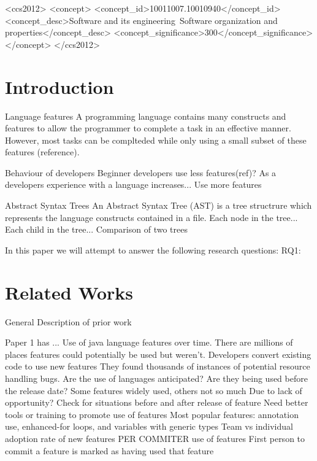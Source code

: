 \documentclass{sig-alternate-05-2015}
\begin{document}
%
%

\begin{CCSXML}
<ccs2012>
<concept>
<concept_id>10011007.10010940</concept_id>
<concept_desc>Software and its engineering~Software organization and properties</concept_desc>
<concept_significance>300</concept_significance>
</concept>
</ccs2012>
\end{CCSXML}



%
%

%
%
\printccsdesc



\section{Introduction}
Language features
A programming language contains many constructs and features to allow the programmer to 
complete a task in an effective manner. However, most tasks can be complteded
while only using a small subset of these features (reference).

Behaviour of developers
Beginner developers use less features(ref)?
As a developers experience with a language increases... Use more features

Abstract Syntax Trees
An Abstract Syntax Tree (AST) is a tree structrure which represents the 
language constructs contained in a file. Each node in the tree... 
Each child in the tree...
Comparison of two trees

In this paper we will attempt to answer the following research questions:
RQ1:



\section{Related Works}
General Description of prior work

Paper 1 has ...
Use of java language features over time.
 There are millions of places features could potentially be used but weren't. 
Developers convert existing code to use new features
They found thousands of instances of potential resource handling bugs.
Are the use of languages anticipated? 
Are they being used before the release date?
Some features widely used, others not so much
Due to lack of opportunity? Check for situations before and after release of feature
Need better tools or training to promote use of features
Most popular features: annotation use, enhanced-for loops, and variables with generic types
Team vs individual adoption rate of new features
PER COMMITER use of features
First person to commit a feature is marked as having used that feature
\end{document}

